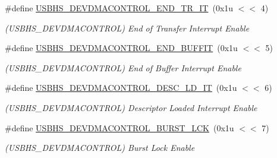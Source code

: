 \begin{DoxyCompactItemize}
\mbox{\label{group__SAME70__USBHS_ga3a52e66b770dc75e0bd3fa0306a56292}} 
\#define \mbox{\hyperlink{group__SAME70__USBHS_ga3a52e66b770dc75e0bd3fa0306a56292}{U\+S\+B\+H\+S\+\_\+\+D\+E\+V\+D\+M\+A\+C\+O\+N\+T\+R\+O\+L\+\_\+\+E\+N\+D\+\_\+\+T\+R\+\_\+\+IT}}~(0x1u $<$$<$ 4)
\begin{DoxyCompactList}\small\item\em (U\+S\+B\+H\+S\+\_\+\+D\+E\+V\+D\+M\+A\+C\+O\+N\+T\+R\+OL) End of Transfer Interrupt Enable \end{DoxyCompactList}\item 
\mbox{\label{group__SAME70__USBHS_ga86c6fe730699f43a24dc19e6c7f2ac66}} 
\#define \mbox{\hyperlink{group__SAME70__USBHS_ga86c6fe730699f43a24dc19e6c7f2ac66}{U\+S\+B\+H\+S\+\_\+\+D\+E\+V\+D\+M\+A\+C\+O\+N\+T\+R\+O\+L\+\_\+\+E\+N\+D\+\_\+\+B\+U\+F\+F\+IT}}~(0x1u $<$$<$ 5)
\begin{DoxyCompactList}\small\item\em (U\+S\+B\+H\+S\+\_\+\+D\+E\+V\+D\+M\+A\+C\+O\+N\+T\+R\+OL) End of Buffer Interrupt Enable \end{DoxyCompactList}\item 
\mbox{\label{group__SAME70__USBHS_ga86a14d59330c7ea07601a2b61ac6529e}} 
\#define \mbox{\hyperlink{group__SAME70__USBHS_ga86a14d59330c7ea07601a2b61ac6529e}{U\+S\+B\+H\+S\+\_\+\+D\+E\+V\+D\+M\+A\+C\+O\+N\+T\+R\+O\+L\+\_\+\+D\+E\+S\+C\+\_\+\+L\+D\+\_\+\+IT}}~(0x1u $<$$<$ 6)
\begin{DoxyCompactList}\small\item\em (U\+S\+B\+H\+S\+\_\+\+D\+E\+V\+D\+M\+A\+C\+O\+N\+T\+R\+OL) Descriptor Loaded Interrupt Enable \end{DoxyCompactList}\item 
\mbox{\label{group__SAME70__USBHS_ga943997858212b2d56ab97dda52ffeb58}} 
\#define \mbox{\hyperlink{group__SAME70__USBHS_ga943997858212b2d56ab97dda52ffeb58}{U\+S\+B\+H\+S\+\_\+\+D\+E\+V\+D\+M\+A\+C\+O\+N\+T\+R\+O\+L\+\_\+\+B\+U\+R\+S\+T\+\_\+\+L\+CK}}~(0x1u $<$$<$ 7)
\begin{DoxyCompactList}\small\item\em (U\+S\+B\+H\+S\+\_\+\+D\+E\+V\+D\+M\+A\+C\+O\+N\+T\+R\+OL) Burst Lock Enable \end{DoxyCompactList}\item 

\end{DoxyCompactItemize}
